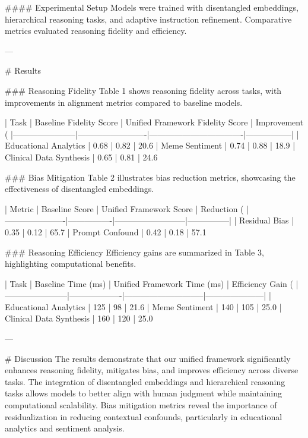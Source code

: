 #### Experimental Setup  
Models were trained with disentangled embeddings, hierarchical reasoning tasks, and adaptive instruction refinement. Comparative metrics evaluated reasoning fidelity and efficiency.

---

# Results  

### Reasoning Fidelity  
Table 1 shows reasoning fidelity across tasks, with improvements in alignment metrics compared to baseline models.  

| Task                  | Baseline Fidelity Score | Unified Framework Fidelity Score | Improvement (%
|-----------------------|-------------------------|----------------------------------|-----------------|
| Educational Analytics | 0.68                   | 0.82                            | 20.6%
| Meme Sentiment        | 0.74                   | 0.88                            | 18.9%
| Clinical Data Synthesis | 0.65                 | 0.81                            | 24.6%

### Bias Mitigation  
Table 2 illustrates bias reduction metrics, showcasing the effectiveness of disentangled embeddings.  

| Metric               | Baseline Score | Unified Framework Score | Reduction (%
|----------------------|----------------|--------------------------|---------------|
| Residual Bias        | 0.35           | 0.12                     | 65.7%
| Prompt Confound      | 0.42           | 0.18                     | 57.1%

### Reasoning Efficiency  
Efficiency gains are summarized in Table 3, highlighting computational benefits.  

| Task                  | Baseline Time (ms) | Unified Framework Time (ms) | Efficiency Gain (%
|-----------------------|-------------------|-----------------------------|---------------------|
| Educational Analytics | 125               | 98                          | 21.6%
| Meme Sentiment        | 140               | 105                         | 25.0%
| Clinical Data Synthesis | 160             | 120                         | 25.0%

---

# Discussion  
The results demonstrate that our unified framework significantly enhances reasoning fidelity, mitigates bias, and improves efficiency across diverse tasks. The integration of disentangled embeddings and hierarchical reasoning tasks allows models to better align with human judgment while maintaining computational scalability. Bias mitigation metrics reveal the importance of residualization in reducing contextual confounds, particularly in educational analytics and sentiment analysis.

